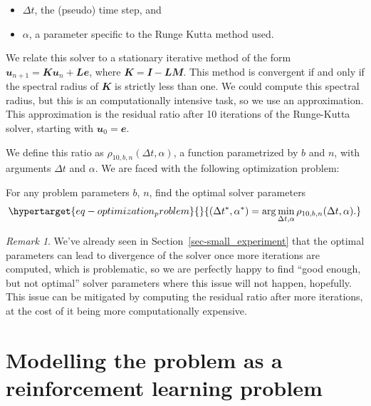 \documentclass[
  letterpaper,
]{report}
\providecommand{\tightlist}{%
  \setlength{\itemsep}{0pt}\setlength{\parskip}{0pt}}\usepackage{longtable,booktabs,array}
\theoremstyle{plain}
\theoremstyle{definition}
\theoremstyle{definition}
\theoremstyle{remark}
\newtheorem*{remark}{Remark}
\begin{document}
\begin{itemize}
\tightlist
\item
  \(\Delta t\), the (pseudo) time step, and
\item
  \(\alpha\), a parameter specific to the Runge Kutta method used.
\end{itemize}

We relate this solver to a stationary iterative method of the form
\(\mathbfit{u}_{n+1} = \mathbfit{Ku}_n + \mathbfit{Le}\), where
\(\mathbfit{K} = \mathbfit{I}-\mathbfit{LM}\). This method is convergent
if and only if the spectral radius of \(\mathbfit{K}\) is strictly less
than one. We could compute this spectral radius, but this is an
computationally intensive task, so we use an approximation. This
approximation is the residual ratio after 10 iterations of the
Runge-Kutta solver, starting with \(\mathbfit{u}_0 = \mathbfit{e}\).

We define this ratio as \(\rho_{10, b, n}(\Delta t, \alpha)\), a
function parametrized by \(b\) and \(n\), with arguments \(\Delta t\)
and \(\alpha\). We are faced with the following optimization problem:

For any problem parameters \(b\), \(n\), find the optimal solver
parameters
\begin{equation}\protect\hypertarget{eq-optimization_problem}{}{
(\Delta t^*, \alpha^*) =  \arg \min_{\Delta t, \alpha} \rho_{10, b , n}(\Delta t, \alpha).
}\label{eq-optimization_problem}\end{equation}

\begin{remark}

We've already seen in Section~\ref{sec-small_experiment} that the
optimal parameters can lead to divergence of the solver once more
iterations are computed, which is problematic, so we are perfectly happy
to find ``good enough, but not optimal'' solver parameters where this
issue will not happen, hopefully. This issue can be mitigated by
computing the residual ratio after more iterations, at the cost of it
being more computationally expensive.

\end{remark}

\hypertarget{modelling-the-problem-as-a-reinforcement-learning-problem}{%
\section{Modelling the problem as a reinforcement learning
problem}\label{modelling-the-problem-as-a-reinforcement-learning-problem}}
\end{document}
